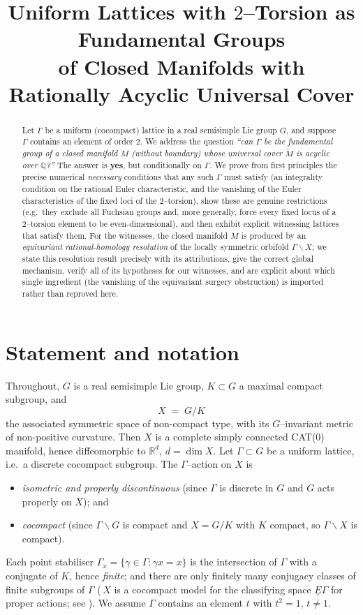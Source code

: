 \documentclass[12pt]{article}
\title{Uniform Lattices with $2$--Torsion as Fundamental Groups\\
of Closed Manifolds with Rationally Acyclic Universal Cover}
\author{}
\date{}
\newcommand{\bR}{\mathbb{R}}
\newcommand{\bQ}{\mathbb{Q}}
\theoremstyle{definition}
\begin{document}
\maketitle

\begin{abstract}
Let $\Gamma$ be a uniform (cocompact) lattice in a real semisimple Lie group $G$,
and suppose $\Gamma$ contains an element of order $2$.  We address the question
\emph{``can $\Gamma$ be the fundamental group of a closed manifold $M$ (without
boundary) whose universal cover $\widetilde M$ is acyclic over $\bQ$?''}  The
answer is \textbf{yes}, but conditionally on $\Gamma$.  We prove from first
principles the precise numerical \emph{necessary} conditions that any such
$\Gamma$ must satisfy (an integrality condition on the rational Euler
characteristic, and the vanishing of the Euler characteristics of the fixed loci
of the $2$--torsion), show these are genuine restrictions (e.g.\ they exclude all
Fuchsian groups and, more generally, force every fixed locus of a $2$--torsion
element to be even-dimensional), and then exhibit explicit witnessing lattices
that satisfy them.  For the witnesses, the closed manifold $M$ is produced by an
\emph{equivariant rational-homology resolution} of the locally symmetric orbifold
$\Gamma\backslash X$; we state this resolution result precisely with its
attributions, give the correct global mechanism, verify all of its hypotheses for
our witnesses, and are explicit about which single ingredient (the vanishing of
the equivariant surgery obstruction) is imported rather than reproved here.
\end{abstract}

\section{Statement and notation}

Throughout, $G$ is a real semisimple Lie group, $K\subset G$ a maximal compact
subgroup, and
\[
   X \;=\; G/K
\]
the associated symmetric space of non-compact type, with its $G$--invariant
metric of non-positive curvature.  Then $X$ is a complete simply connected
CAT($0$) manifold, hence diffeomorphic to $\bR^{d}$, $d=\dim X$.  Let
$\Gamma\subset G$ be a uniform lattice, i.e.\ a discrete cocompact subgroup.  The
$\Gamma$--action on $X$ is

\begin{itemize}
\item \emph{isometric and properly discontinuous} (since $\Gamma$ is discrete in
$G$ and $G$ acts properly on $X$); and
\item \emph{cocompact} (since $\Gamma\backslash G$ is compact and $X=G/K$ with $K$
compact, so $\Gamma\backslash X$ is compact).
\end{itemize}
Each point stabiliser $\Gamma_x=\{\gamma\in\Gamma:\gamma x=x\}$ is the
intersection of $\Gamma$ with a conjugate of $K$, hence \emph{finite}; and there
are only finitely many conjugacy classes of finite subgroups of $\Gamma$
(\,$X$ is a cocompact model for the classifying space $\underline E\Gamma$ for
proper actions; see \cite[\S2]{Lueck}).  We assume $\Gamma$ contains an element
$t$ with $t^2=1$, $t\neq1$.
\end{document}
